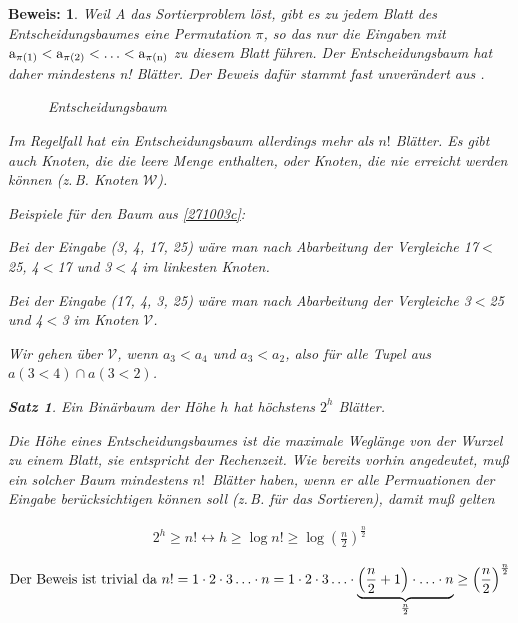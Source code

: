 \documentclass[ngerman,draft,parskip=half*,twoside]{scrreprt}
\theoremstyle{break}
\newtheorem{satz}{Satz}[chapter]
\theoremstyle{nonumberbreak}
\newtheorem{beweis}{Beweis:}
\begin{document}
\begin{beweis}
Weil A das Sortierproblem löst, gibt es zu jedem Blatt des Entscheidungsbaumes eine Permutation $\pi$, so das nur die Eingaben mit 
$\textup{a}_{\pi(1)}<\textup{a}_{\pi(2)}<\ldots<\textup{a}_{\pi(\textup{n})}$ zu diesem Blatt führen. Der Entscheidungsbaum hat 
daher mindestens n! Blätter. Der Beweis dafür stammt fast unverändert aus \cite{klein}.
 
%
  \begin{figure}
    \centering
  \caption{Entscheidungsbaum}
  \label{271003c}
  \end{figure}

Im Regelfall hat ein Entscheidungsbaum allerdings mehr 
als $n!$ Blätter. Es gibt auch Knoten, die die leere Menge enthalten, oder Knoten, die nie erreicht werden können
(z.\,B. Knoten $\mathcal{W}$).


	
Beispiele für den Baum aus \autoref{271003c}:

Bei der Eingabe (3, 4, 17, 25) wäre man nach Abarbeitung der Vergleiche 17$<$25, 4$<$17 und 3$<$4 im linkesten Knoten.


Bei der Eingabe (17, 4, 3, 25) wäre man nach Abarbeitung der Vergleiche 3$<$25 und 4$<$3 im Knoten $\mathcal{V}$.


Wir gehen über $\mathcal{V}$, wenn $a_3 < a_4$ und $a_3 < a_2 $, also für alle Tupel aus $ a(3<4) \cap a(3<2) $.

  \begin{satz}
  Ein Binärbaum der Höhe $h$ hat höchstens $ 2^h $ Blätter.
  \end{satz} 
 
Die Höhe eines Entscheidungsbaumes ist die maximale Weglänge von der Wurzel zu einem Blatt, sie entspricht der Rechenzeit. Wie bereits vorhin angedeutet, muß ein
solcher Baum mindestens $n!$~Blätter haben, wenn er alle Permuationen der Eingabe berücksichtigen können soll (z.\,B. für das
Sortieren), damit muß gelten

  \begin{gather*}
   2^h \geq n! \leftrightarrow h \geq \log n! \geq \log \left(\frac{n}{2}\right)^{\frac{n}{2}}  
  \end{gather*}

  \begin{gather*}
  \textup{Der Beweis ist trivial da}\
  n! = 1 \cdot 2 \cdot 3 \ldots \cdot n = 1 \cdot 2 \cdot 3 \ldots \cdot \underbrace{\left(\frac{n}{2}+1\right) \cdot \ldots 
  \cdot n}_{\frac{n}{2}} \geq \left(\frac{n}{2}\right)^{\frac{n}{2}} 
  \end{gather*}


\end{beweis}
\end{document}
